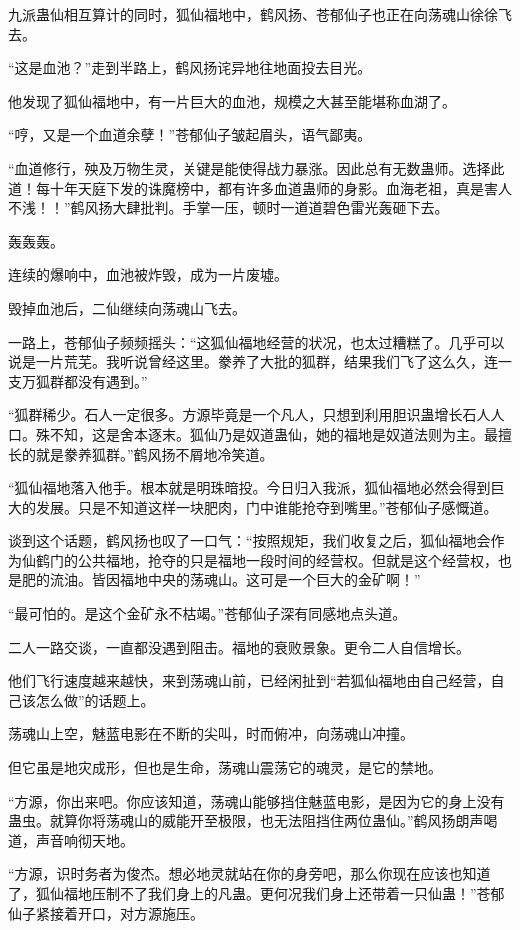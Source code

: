 \begin{this_body}
九派蛊仙相互算计的同时，狐仙福地中，鹤风扬、苍郁仙子也正在向荡魂山徐徐飞去。

“这是血池？”走到半路上，鹤风扬诧异地往地面投去目光。

他发现了狐仙福地中，有一片巨大的血池，规模之大甚至能堪称血湖了。

“哼，又是一个血道余孽！”苍郁仙子皱起眉头，语气鄙夷。

“血道修行，殃及万物生灵，关键是能使得战力暴涨。因此总有无数蛊师。选择此道！每十年天庭下发的诛魔榜中，都有许多血道蛊师的身影。血海老祖，真是害人不浅！！”鹤风扬大肆批判。手掌一压，顿时一道道碧色雷光轰砸下去。

轰轰轰。

连续的爆响中，血池被炸毁，成为一片废墟。

毁掉血池后，二仙继续向荡魂山飞去。

一路上，苍郁仙子频频摇头：“这狐仙福地经营的状况，也太过糟糕了。几乎可以说是一片荒芜。我听说曾经这里。豢养了大批的狐群，结果我们飞了这么久，连一支万狐群都没有遇到。”

“狐群稀少。石人一定很多。方源毕竟是一个凡人，只想到利用胆识蛊增长石人人口。殊不知，这是舍本逐末。狐仙乃是奴道蛊仙，她的福地是奴道法则为主。最擅长的就是豢养狐群。”鹤风扬不屑地冷笑道。

“狐仙福地落入他手。根本就是明珠暗投。今日归入我派，狐仙福地必然会得到巨大的发展。只是不知道这样一块肥肉，门中谁能抢夺到嘴里。”苍郁仙子感慨道。

谈到这个话题，鹤风扬也叹了一口气：“按照规矩，我们收复之后，狐仙福地会作为仙鹤门的公共福地，抢夺的只是福地一段时间的经营权。但就是这个经营权，也是肥的流油。皆因福地中央的荡魂山。这可是一个巨大的金矿啊！”

“最可怕的。是这个金矿永不枯竭。”苍郁仙子深有同感地点头道。

二人一路交谈，一直都没遇到阻击。福地的衰败景象。更令二人自信增长。

他们飞行速度越来越快，来到荡魂山前，已经闲扯到“若狐仙福地由自己经营，自己该怎么做”的话题上。

荡魂山上空，魅蓝电影在不断的尖叫，时而俯冲，向荡魂山冲撞。

但它虽是地灾成形，但也是生命，荡魂山震荡它的魂灵，是它的禁地。

“方源，你出来吧。你应该知道，荡魂山能够挡住魅蓝电影，是因为它的身上没有蛊虫。就算你将荡魂山的威能开至极限，也无法阻挡住两位蛊仙。”鹤风扬朗声喝道，声音响彻天地。

“方源，识时务者为俊杰。想必地灵就站在你的身旁吧，那么你现在应该也知道了，狐仙福地压制不了我们身上的凡蛊。更何况我们身上还带着一只仙蛊！”苍郁仙子紧接着开口，对方源施压。


\end{this_body}
